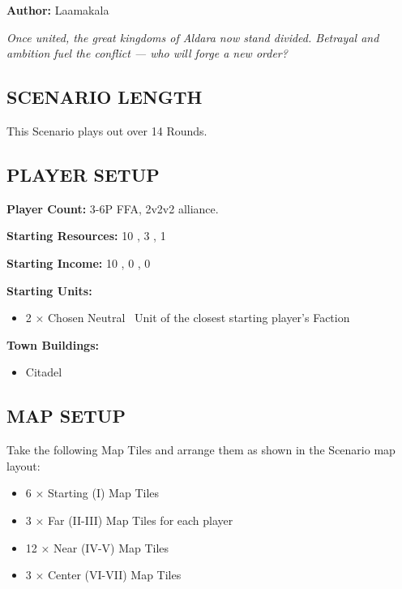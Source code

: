 
\begin{multicols*}{2}

\textbf{Author:} Laamakala

\textit{Once united, the great kingdoms of Aldara now stand divided. Betrayal and ambition fuel the conflict — who will forge a new order?}  %

\subsection*{\MakeUppercase{Scenario Length}}
This Scenario plays out over 14 Rounds.

\subsection*{\MakeUppercase{Player Setup}}
\textbf{Player Count:} 3-6P FFA, 2v2v2 alliance.

\textbf{Starting Resources:} 10 , 3 , 1 

\textbf{Starting Income:} 10 , 0 , 0 

\textbf{Starting Units:}

\begin{itemize}
  \item 2 × Chosen Neutral \bronze\ Unit of the closest starting player's Faction
\end{itemize}

\textbf{Town Buildings:}
\begin{itemize}
  \item Citadel
\end{itemize}

\subsection*{\MakeUppercase{Map Setup}}
Take the following Map Tiles and arrange them as shown in the Scenario map layout:

\begin{itemize}
  \item 6 × Starting (I) Map Tiles
  \item 3 × Far (II-III) Map Tiles for each player
  \item 12 × Near (IV-V) Map Tiles
  \item 3 × Center (VI-VII) Map Tiles
\end{itemize}


\end{multicols*}
